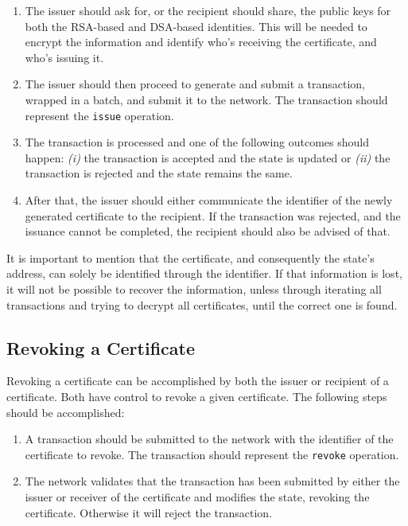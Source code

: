 \begin{enumerate}
	\item The issuer should ask for, or the recipient should share, the public keys for both the RSA-based and DSA-based identities. This will be needed to encrypt the information and identify who's receiving the certificate, and who's issuing it.
	\item The issuer should then proceed to generate and submit a transaction, wrapped in a batch, and submit it to the network. The transaction should represent the \texttt{issue} operation.
	\item The transaction is processed and one of the following outcomes should happen: \emph{(i)} the transaction is accepted and the state is updated or \emph{(ii)} the transaction is rejected and the state remains the same.
	\item After that, the issuer should either communicate the identifier of the newly generated certificate to the recipient. If the transaction was rejected, and the issuance cannot be completed, the recipient should also be advised of that.
\end{enumerate}

It is important to mention that the certificate, and consequently the state's address, can solely be identified through the identifier. If that information is lost, it will not be possible to recover the information, unless through iterating all transactions and trying to decrypt all certificates, until the correct one is found.

\subsection{Revoking a Certificate}

Revoking a certificate can be accomplished by both the issuer or recipient of a certificate. Both have control to revoke a given certificate. The following steps should be accomplished:

\begin{enumerate}
	\item A transaction should be submitted to the network with the identifier of the certificate to revoke. The transaction should represent the \texttt{revoke} operation.
	\item The network validates that the transaction has been submitted by either the issuer or receiver of the certificate and modifies the state, revoking the certificate. Otherwise it will reject the transaction.
\end{enumerate}

